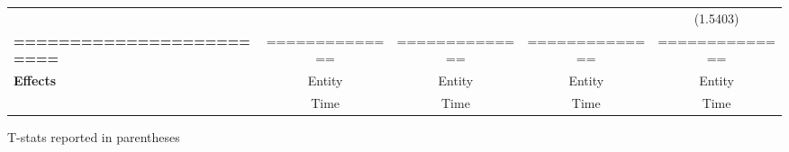 \begin{center}
\begin{tabular}{lcccc}
\textbf{ }                         &                &                  &                  &     (1.5403)      \\
\textbf{=========================} & ============== &  ==============  &  ==============  &  ==============   \\
\textbf{Effects}                   &     Entity     &      Entity      &      Entity      &      Entity       \\
\textbf{}                          &      Time      &       Time       &       Time       &       Time        \\
\bottomrule
\end{tabular}
\end{center}

T-stats reported in parentheses